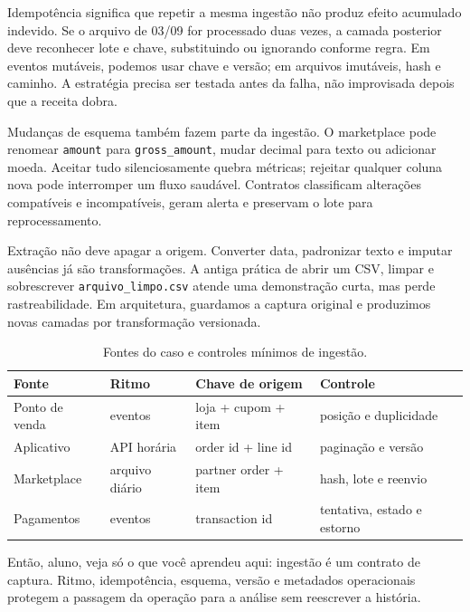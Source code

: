 Idempotência significa que repetir a mesma ingestão não produz efeito acumulado indevido. Se o arquivo de 03/09 for processado duas vezes, a camada posterior deve reconhecer lote e chave, substituindo ou ignorando conforme regra. Em eventos mutáveis, podemos usar chave e versão; em arquivos imutáveis, hash e caminho. A estratégia precisa ser testada antes da falha, não improvisada depois que a receita dobra.

Mudanças de esquema também fazem parte da ingestão. O marketplace pode renomear \texttt{amount} para \texttt{gross\_amount}, mudar decimal para texto ou adicionar moeda. Aceitar tudo silenciosamente quebra métricas; rejeitar qualquer coluna nova pode interromper um fluxo saudável. Contratos classificam alterações compatíveis e incompatíveis, geram alerta e preservam o lote para reprocessamento.

Extração não deve apagar a origem. Converter data, padronizar texto e imputar ausências já são transformações. A antiga prática de abrir um CSV, limpar e sobrescrever \texttt{arquivo\_limpo.csv} atende uma demonstração curta, mas perde rastreabilidade. Em arquitetura, guardamos a captura original e produzimos novas camadas por transformação versionada.

\begin{table}[htbp]
\centering
\small
\caption{Fontes do caso e controles mínimos de ingestão.}
\label{tab:fontes-ingestao}
\begin{tabularx}{0.96\textwidth}{@{}p{2.7cm}p{2.4cm}YY@{}}
\toprule
\textbf{Fonte} & \textbf{Ritmo} & \textbf{Chave de origem} & \textbf{Controle} \\
\midrule
Ponto de venda & eventos & loja + cupom + item & posição e duplicidade \\
Aplicativo & API horária & order id + line id & paginação e versão \\
Marketplace & arquivo diário & partner order + item & hash, lote e reenvio \\
Pagamentos & eventos & transaction id & tentativa, estado e estorno \\
\bottomrule
\end{tabularx}
\end{table}

\begin{SummaryBox}
Então, aluno, veja só o que você aprendeu aqui: ingestão é um contrato de captura. Ritmo, idempotência, esquema, versão e metadados operacionais protegem a passagem da operação para a análise sem reescrever a história.
\end{SummaryBox}

